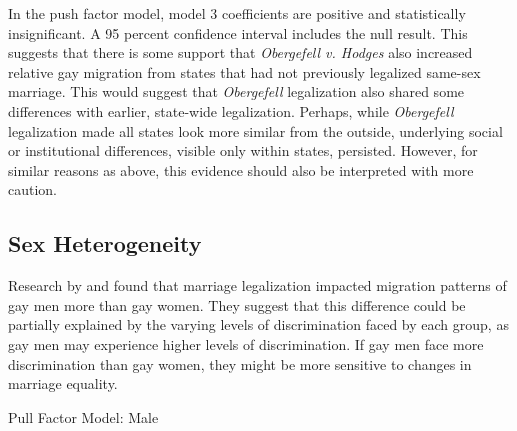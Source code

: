 \documentclass[12pt,letterpaper]{article}
\begin{document}
In the push factor model, model 3 coefficients are positive and statistically insignificant. A 95 percent confidence interval includes the null result. This suggests that there is some support that \textit{Obergefell v. Hodges} also increased relative gay migration from states that had not previously legalized same-sex marriage. This would suggest that \textit{Obergefell} legalization also shared some differences with earlier, state-wide legalization. Perhaps, while \textit{Obergefell} legalization made all states look more similar from the outside, underlying social or institutional differences, visible only within states, persisted. However, for similar reasons as above, this evidence should also be interpreted with more caution.

\FloatBarrier
\subsection{Sex Heterogeneity}
Research by \citet{1} and \cite{12} found that marriage legalization impacted migration patterns of gay men more than gay women. They suggest that this difference could be partially explained by the varying levels of discrimination faced by each group, as gay men may experience higher levels of discrimination.  If gay men face more discrimination than gay women, they might be more sensitive to changes in marriage equality.

\begin{table}[htbp]
    \centering
    \caption{Pull Factor Model: Male}
    \label{tab: male_expost_model}
    
\end{table}
\end{document}
